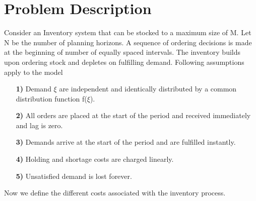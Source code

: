\documentclass[10pt,a4paper,oneside]{report}
\begin{document}
\chapter{Problem Description}
Consider an Inventory system that can be stocked to a maximum size of M. Let N be the number of planning horizons. A sequence of ordering decisions is made at the beginning of number of equally spaced intervals. The inventory builds upon ordering stock and depletes on fulfilling demand. Following assumptions apply to the model 
\begin{enumerate}
\item[\textbf{1)}] Demand $\xi$ are independent and identically distributed by a common distribution function f($\xi$).
\item[\textbf{2)}] All orders are placed at the start of the period and received immediately and lag is zero.
\item[\textbf{3)}] Demands arrive at the start of the period and are fulfilled instantly.
\item[\textbf{4)}] Holding and shortage costs are charged linearly.
\item[\textbf{5)}] Unsatisfied demand is lost forever.
\end{enumerate}
\noindent Now we define the different costs associated with the inventory process.\\
\end{document}
